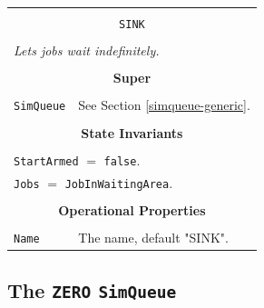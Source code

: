 \documentclass[12pt]{book}
\begin{document}
\begin{tabular}{|l|l|l|}
\hline
\multicolumn{3}{|c|}{} \\
\multicolumn{3}{|c|}{\lstinline[basicstyle=\large]{SINK}} \\
\multicolumn{3}{|c|}{} \\
\hline
\multicolumn{3}{|l|}{\em Lets jobs wait indefinitely.} \\
\hline
\multicolumn{3}{|c|}{} \\
\multicolumn{3}{|c|}{\bf Super} \\
\multicolumn{3}{|c|}{} \\
\hline
\lstinline|SimQueue| & \multicolumn{2}{|l|}{See Section \ref{simqueue-generic}.} \\
\hline
\multicolumn{3}{|c|}{} \\
\multicolumn{3}{|c|}{\bf State  Invariants} \\
\multicolumn{3}{|c|}{} \\
\hline
\multicolumn{3}{|l|}{\lstinline|StartArmed| $=$ \lstinline|false|.} \\
\multicolumn{3}{|l|}{\lstinline|Jobs| $=$ \lstinline|JobInWaitingArea|.} \\
\hline
\multicolumn{3}{|c|}{} \\
\multicolumn{3}{|c|}{\bf Operational Properties} \\
\multicolumn{3}{|c|}{} \\
\hline
\lstinline|Name|      & \multicolumn{2}{|l|}{The name, default "SINK".} \\
\hline
\end{tabular}

\subsection{The \lstinline{ZERO} \lstinline{SimQueue}}
\end{document}
